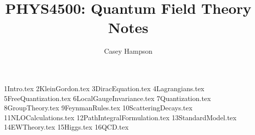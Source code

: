 \documentclass[titlepage]{article}
\title{PHYS4500: Quantum Field Theory Notes}
\author{Casey Hampson}
\begin{document}
    \maketitle
    \pagebreak

    {1Intro.tex}
    {2KleinGordon.tex}
    {3DiracEquation.tex}
    {4Lagrangians.tex}
    {5FreeQuantization.tex}
    {6LocalGaugeInvariance.tex}
    {7Quantization.tex}
    {8GroupTheory.tex}
    {9FeynmanRules.tex}
    {10ScatteringDecays.tex}
    {11NLOCalculations.tex}
    {12PathIntegralFormulation.tex}
    {13StandardModel.tex}
    {14EWTheory.tex}
    {15Higgs.tex}
    {16QCD.tex}

    
\end{document}
